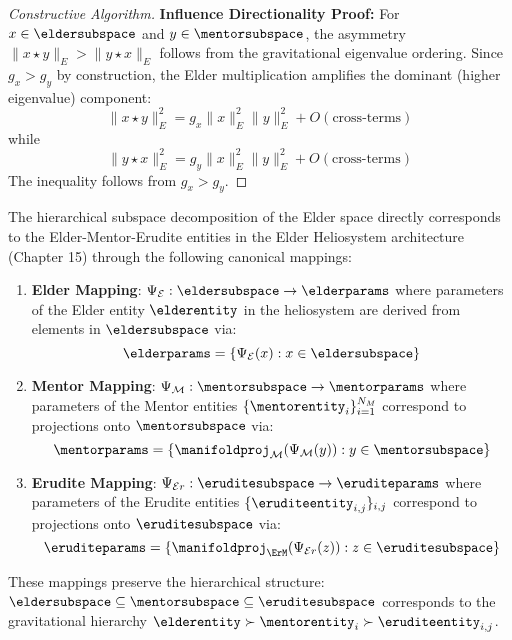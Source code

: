 \begin{proof}[Constructive Algorithm]
\textbf{Influence Directionality Proof:} For $x \in \eldersubspace$ and $y \in \mentorsubspace$, the asymmetry $\|x \star y\|_E > \|y \star x\|_E$ follows from the gravitational eigenvalue ordering. Since $g_x > g_y$ by construction, the Elder multiplication amplifies the dominant (higher eigenvalue) component:
\begin{equation}
\|x \star y\|_E^2 = g_x \|x\|_E^2 \|y\|_E^2 + O(\text{cross-terms})
\end{equation}
while 
\begin{equation}
\|y \star x\|_E^2 = g_y \|x\|_E^2 \|y\|_E^2 + O(\text{cross-terms})
\end{equation}
The inequality follows from $g_x > g_y$.
\end{proof}

\begin{theorem}
\label{thm:heliosystem_correspondence}
The hierarchical subspace decomposition of the Elder space directly corresponds to the Elder-Mentor-Erudite entities in the Elder Heliosystem architecture (Chapter 15) through the following canonical mappings:
\begin{enumerate}
    \item \textbf{Elder Mapping}: $\Psi_{\mathcal{E}}: \eldersubspace \rightarrow \elderparams$ where parameters of the Elder entity $\elderentity$ in the heliosystem are derived from elements in $\eldersubspace$ via:
    \begin{equation}
        \elderparams = \{\Psi_{\mathcal{E}}(x) : x \in \eldersubspace\}
    \end{equation}
    
    \item \textbf{Mentor Mapping}: $\Psi_{\mathcal{M}}: \mentorsubspace \rightarrow \mentorparams$ where parameters of the Mentor entities $\{\mentorentity_i\}_{i=1}^{N_M}$ correspond to projections onto $\mentorsubspace$ via:
    \begin{equation}
        \mentorparams = \{\manifoldproj_{\mathcal{M}}(\Psi_{\mathcal{M}}(y)) : y \in \mentorsubspace\}
    \end{equation}
    
    \item \textbf{Erudite Mapping}: $\Psi_{\mathcal{E}r}: \eruditesubspace \rightarrow \eruditeparams$ where parameters of the Erudite entities $\{\eruditeentity_{i,j}\}_{i,j}$ correspond to projections onto $\eruditesubspace$ via:
    \begin{equation}
        \eruditeparams = \{\manifoldproj_{\ErM}(\Psi_{\mathcal{E}r}(z)) : z \in \eruditesubspace\}
    \end{equation}
\end{enumerate}

These mappings preserve the hierarchical structure: $\eldersubspace \subseteq \mentorsubspace \subseteq \eruditesubspace$ corresponds to the gravitational hierarchy $\elderentity \succ \mentorentity_i \succ \eruditeentity_{i,j}$.
\end{theorem}

